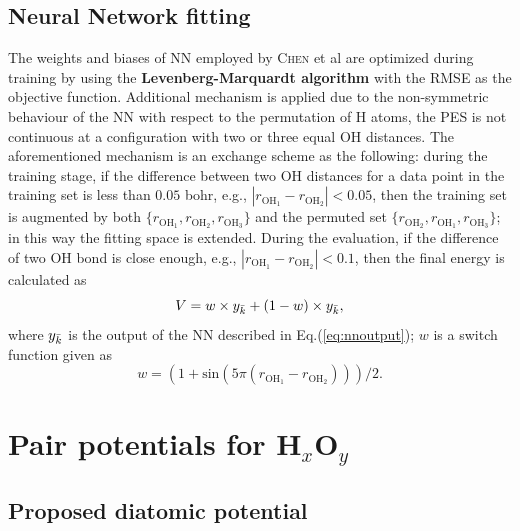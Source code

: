 \documentclass[12pt]{article}
\begin{document}
\subsection{Neural Network fitting}
The weights and biases of NN employed by \textsc{Chen} et al \cite{idx60} are optimized during training by using the \textbf{Levenberg-Marquardt algorithm} \cite{lmalgo} with the RMSE as the objective function.
Additional mechanism is applied due to the non-symmetric behaviour of the NN with respect to the permutation of H atoms, the PES is not continuous at a configuration with two or three equal OH distances. The aforementioned mechanism is an exchange scheme as the following: during the training stage, if the difference between two OH distances for a data point in the training set is less than $0.05$ bohr, e.g., $|r_{\text{OH}_1} - r_{\text{OH}_2}| < 0.05$, then the training set is augmented by both $\{r_{\text{OH}_1}, r_{\text{OH}_2}, r_{\text{OH}_3}\}$ and the permuted set $\{r_{\text{OH}_2}, r_{\text{OH}_1}, r_{\text{OH}_3}\}$; in this way the fitting space is extended. During the evaluation, if the difference of two OH bond is close enough, e.g., $|r_{\text{OH}_1} - r_{\text{OH}_2}| < 0.1$, then the final energy is calculated as
\begin{equation}
    V = w \times y_{\Bar{k}} + (1-w) \times y_{\Bar{k}},
    \label{eq:nnfinalenergy}
\end{equation}
where $y_{\Bar{k}}$ is the output of the NN described in Eq.(\ref{eq:nnoutput}); $w$ is a switch function given as
\begin{equation}
    w = (1+\text{sin}\left(5\pi(r_{\text{OH}_1} - r_{\text{OH}_2})\right))/2.
\end{equation}

\section{Pair potentials for H$_x$O$_y$}
\label{section:pairpot}

\subsection{Proposed diatomic potential}
\end{document}
